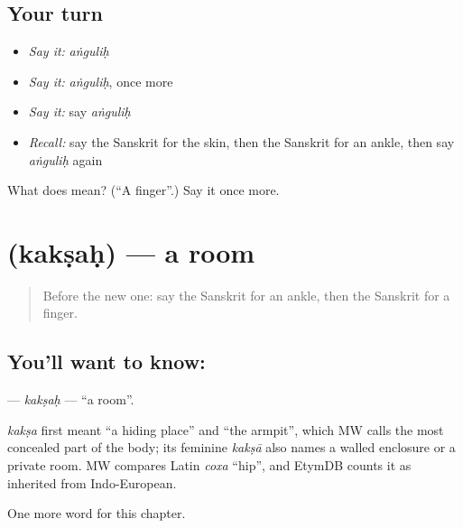 \subsection*{Your turn}
\begin{itemize}
\raggedright
  \item \emph{Say it:} \emph{aṅguliḥ}
  \item \emph{Say it:} \emph{aṅguliḥ}, once more
  \item \emph{Say it:} say \emph{aṅguliḥ}
  \item \emph{Recall:} say the Sanskrit for the skin, then the Sanskrit for an ankle, then say \emph{aṅguliḥ} again
\end{itemize}

\begin{tcolorbox}[breakable,colback=teal!4,colframe=teal!35!black,title={Before you move on}]
What does  mean? (\textquotedblleft{}A finger\textquotedblright{}.) Say it once more.
\end{tcolorbox}
\section[\texorpdfstring{\sk{कक्षः} (kakṣaḥ)}{कक्षः (kakṣaḥ)}]{ (kakṣaḥ) — a room}

\label{lesson:SA-C118-kaksah}



\begin{quote}
Before the new one: say the Sanskrit for an ankle, then the Sanskrit for a finger.
\end{quote}

\subsection*{You'll want to know: }
\textbf{} — \emph{kakṣaḥ} — \textquotedblleft{}a room\textquotedblright{}.

\begin{cousinweb}
\emph{kakṣa} first meant \textquotedblleft{}a hiding place\textquotedblright{} and \textquotedblleft{}the armpit\textquotedblright{}, which MW calls the most concealed part of the body; its feminine \emph{kakṣā} also names a walled enclosure or a private room. MW compares Latin \emph{coxa} \textquotedblleft{}hip\textquotedblright{}, and EtymDB counts it as inherited from Indo-European.
\end{cousinweb}

\begin{grammarlens}[title={What you've built}]
One more word for this chapter.
\end{grammarlens}

